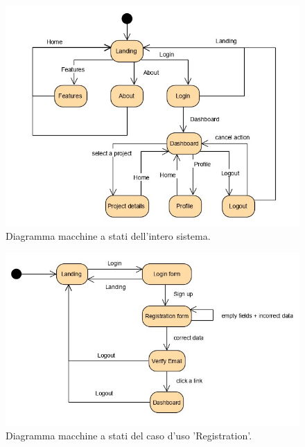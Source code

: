 \begin{figure}[H]
	\centering
	\caption{Diagramma macchine a stati dell'intero sistema.}
	\label{fig:diagramma-macchine-stati:system}
	\includegraphics[width=\textwidth]{images/diagramma-macchine-stati/system}
\end{figure}

\begin{figure}[H]
	\centering
	\caption{Diagramma macchine a stati del caso d'uso 'Registration'.}
	\label{fig:diagramma-macchine-stati:registration}
	\includegraphics[width=\textwidth]{images/diagramma-macchine-stati/registration}
\end{figure}

